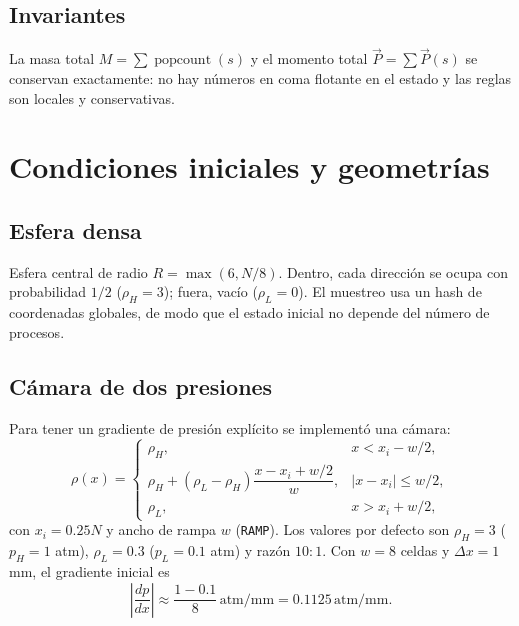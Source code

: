 \documentclass[11pt,a4paper]{article}
\begin{document}
\subsection{Invariantes}

La masa total $M=\sum \operatorname{popcount}(s)$ y el momento total
$\vec{P}=\sum \vec{P}(s)$ se conservan exactamente: no hay números en coma
flotante en el estado y las reglas son locales y conservativas.

\section{Condiciones iniciales y geometrías}

\subsection{Esfera densa}

Esfera central de radio $R=\max(6,N/8)$. Dentro, cada dirección se ocupa con
probabilidad $1/2$ ($\rho_H=3$); fuera, vacío ($\rho_L=0$). El muestreo usa un
hash de coordenadas globales, de modo que el estado inicial no depende del
número de procesos.

\subsection{Cámara de dos presiones}

Para tener un gradiente de presión explícito se implementó una cámara:
\begin{equation}
  \rho(x)=
  \begin{cases}
    \rho_H, & x < x_i - w/2,\\
    \rho_H + (\rho_L-\rho_H)\dfrac{x-x_i+w/2}{w}, & |x-x_i|\le w/2,\\
    \rho_L, & x > x_i + w/2,
  \end{cases}
\end{equation}
con $x_i=0.25N$ y ancho de rampa $w$ (\texttt{RAMP}). Los valores por defecto
son $\rho_H=3$ ($p_H=1$ atm), $\rho_L=0.3$ ($p_L=0.1$ atm) y razón
$10{:}1$. Con $w=8$ celdas y $\Delta x=1$ mm, el gradiente inicial es
\begin{equation}
  \left|\frac{dp}{dx}\right|\approx
  \frac{1-0.1}{8}\,\text{atm/mm}=0.1125\,\text{atm/mm}.
\end{equation}
\end{document}
